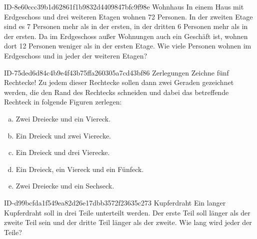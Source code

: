 \begin{exercise}
      {ID-8e60ccc39b1d62861f1b9832d4409847bfc9f98e}
      {Wohnhaus}
  \ifproblem\problem
    In einem Haus mit Erdgeschoss und drei weiteren Etagen wohnen 72 Personen.
    In der zweiten Etage sind es 7 Personen mehr als in der ersten, in der
    dritten 6 Personen mehr als in der ersten. Da im Erdgeschoss außer
    Wohnungen auch ein Geschäft ist, wohnen dort 12 Personen weniger als in
    der ersten Etage. Wie viele Personen wohnen im Erdgeschoss und in jeder
    der weiteren Etagen?
  \fi
\end{exercise}

\begin{exercise}
      {ID-75ded6d84c4b9e4f43b75ffa260305a7cd43bf86}
      {Zerlegungen}
  \ifproblem\problem
    Zeichne fünf Rechtecke! Zu jedem dieser Rechtecke sollen dann zwei Geraden
    gezeichnet werden, die den Rand des Rechtecks schneiden und dabei das
    betreffende Rechteck in folgende Figuren zerlegen:
    \begin{enumerate}[a)]
      \squeeze
      \item Zwei Dreiecke und ein Viereck.
      \item Ein Dreieck und zwei Vierecke.
      \item Ein Dreieck und drei Vierecke.
      \item Ein Dreieck, ein Viereck und ein Fünfeck.
      \item Zwei Dreiecke und ein Sechseck.
    \end{enumerate}
  \fi
\end{exercise}

\begin{exercise}
      {ID-d99bcfda1f549ea82d26e17dbb3572f23635c273}
      {Kupferdraht}
  \ifproblem\problem
    Ein   langer Kupferdraht soll in drei Teile
    unterteilt werden. Der erste Teil soll  länger als der
    zweite Teil sein und der dritte Teil  länger als der zweite.
    Wie lang wird jeder der Teile?
  \fi
\end{exercise}

